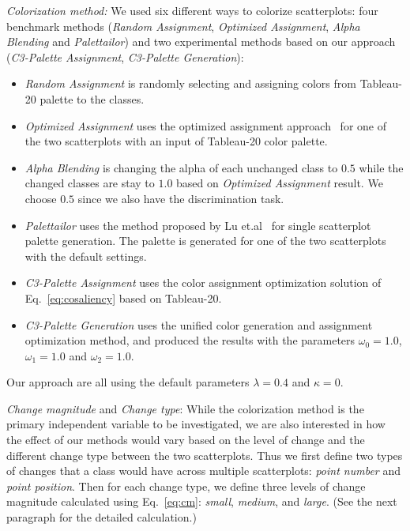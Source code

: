 \emph{Colorization method:} We used six different ways to colorize scatterplots: four benchmark methods (\emph{Random Assignment}, \emph{Optimized Assignment}, \emph{Alpha Blending} and \emph{Palettailor}) and two experimental methods based on our approach (\emph{C3-Palette Assignment}, \emph{C3-Palette Generation}):
\begin{itemize}

     \item \emph{Random Assignment} is randomly selecting and assigning colors from Tableau-20 palette to the classes.

     \item \emph{Optimized Assignment} uses the optimized assignment approach~\cite{Wang2018} for one of the two scatterplots with an input of Tableau-20 color palette.

     \item \emph{Alpha Blending} is changing the alpha of each unchanged class to $0.5$ while the changed classes are stay to $1.0$ based on \emph{Optimized Assignment} result. We choose $0.5$ since we also have the discrimination task.
     \item \emph{Palettailor} uses the method proposed by Lu et.al~\cite{Lu21} for single scatterplot palette generation. The palette is generated for one of the two scatterplots with the default settings.
     \item \emph{C3-Palette Assignment} uses the color assignment optimization solution of Eq.~\ref{eq:cosaliency} based on Tableau-20.
     \item \emph{C3-Palette Generation} uses the unified color generation and assignment optimization method, and produced the results with the parameters $\omega_0=1.0$, $\omega_1=1.0$ and $\omega_2=1.0$.
\end{itemize}
Our approach are all using the default parameters $\lambda=0.4$ and $\kappa=0$.

\emph{Change magnitude} and \emph{Change type}: While the colorization method is the primary independent variable to be investigated, we are also interested in how the effect of our methods would vary based on the level of change and the different change type between the two scatterplots. Thus we first define two types of changes that a class would have across multiple scatterplots: \emph{point number} and \emph{point position}. Then for each change type, we define three levels of change magnitude calculated using Eq.~\ref{eq:cm}: \emph{small}, \emph{medium}, and \emph{large}. (See the next paragraph for the detailed calculation.)

